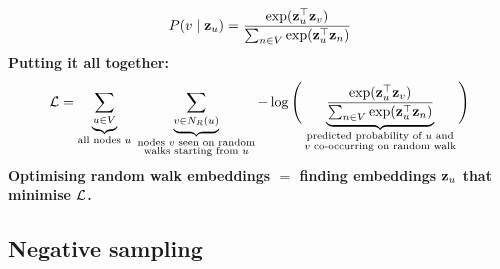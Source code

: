 \begin{equation}\label{eq:lec02-softmax}
  P(v\mid\mathbf{z}_u)=\frac{\exp(\mathbf{z}_u^{\top}\mathbf{z}_v)}{\sum_{n\in V}\exp(\mathbf{z}_u^{\top}\mathbf{z}_n)}
\end{equation}
\textbf{Putting it all together:}
\begin{equation}\label{eq:lec02-loss}
  \mathcal{L}=
  \underbrace{\sum_{u\in V}}_{\text{all nodes }u}\;
  \underbrace{\sum_{v\in N_R(u)}}_{\substack{\text{nodes $v$ seen on random}\\\text{walks starting from }u}}
  -\log\Bigg(
  \underbrace{\frac{\exp(\mathbf{z}_u^{\top}\mathbf{z}_v)}{\sum_{n\in V}\exp(\mathbf{z}_u^{\top}\mathbf{z}_n)}}_{\substack{\text{predicted probability of $u$ and}\\\text{$v$ co-occurring on random walk}}}
  \Bigg)
\end{equation}
\textbf{Optimising random walk embeddings $=$ finding embeddings $\mathbf{z}_u$ that
minimise $\mathcal{L}$.}

\subsection{Negative sampling}\label{sec:lec02-negsampling}

